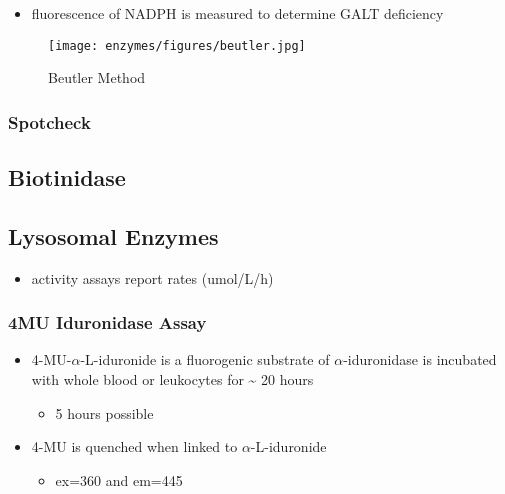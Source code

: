 \documentclass[12pt]{scrartcl}
\begin{document}
\begin{itemize}
\item fluorescence of NADPH is measured to determine GALT deficiency
\end{itemize}

\begin{figure}[htbp]
\centering
\texttt{[image: enzymes/figures/beutler.jpg]}
\caption{\label{fig:orgff3d7b4}Beutler Method}
\end{figure}


\subsubsection{Spotcheck}
\label{sec:org750d17d}





\subsection{Biotinidase}
\label{sec:org9bc270e}



\subsection{Lysosomal Enzymes}
\label{sec:org88980bb}
\begin{itemize}
\item activity assays report rates (umol/L/h)
\end{itemize}

\subsubsection{4MU Iduronidase Assay}
\label{sec:org0431722}
\begin{itemize}
\item 4-MU-\(\alpha\)-L-iduronide is a fluorogenic substrate
of \(\alpha\)-iduronidase is incubated with whole blood or leukocytes for \textasciitilde{} 20 hours
\begin{itemize}
\item 5 hours possible
\end{itemize}
\item 4-MU is quenched when linked to \(\alpha\)-L-iduronide
\begin{itemize}
\item ex=360 and em=445
\end{itemize}
\end{itemize}
\end{document}
